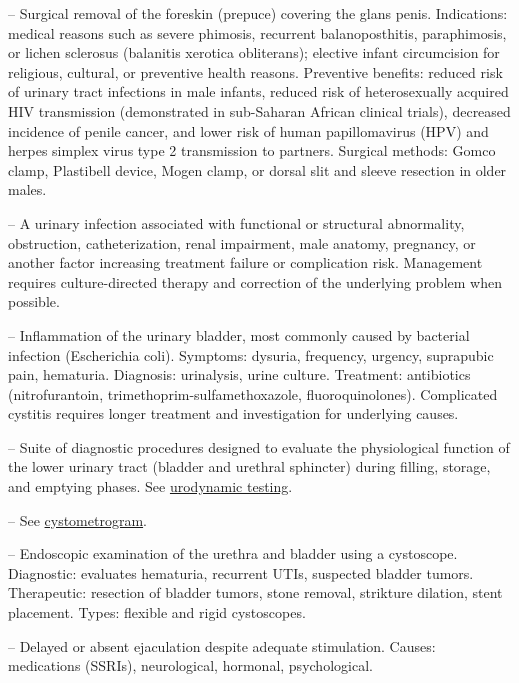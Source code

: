 -- Surgical removal of the foreskin (prepuce) covering the glans penis. Indications: medical reasons such as severe phimosis, recurrent balanoposthitis, paraphimosis, or lichen sclerosus (balanitis xerotica obliterans); elective infant circumcision for religious, cultural, or preventive health reasons. Preventive benefits: reduced risk of urinary tract infections in male infants, reduced risk of heterosexually acquired HIV transmission (demonstrated in sub-Saharan African clinical trials), decreased incidence of penile cancer, and lower risk of human papillomavirus (HPV) and herpes simplex virus type 2 transmission to partners. Surgical methods: Gomco clamp, Plastibell device, Mogen clamp, or dorsal slit and sleeve resection in older males.

-- A urinary infection associated with functional or structural abnormality, obstruction, catheterization, renal impairment, male anatomy, pregnancy, or another factor increasing treatment failure or complication risk. Management requires culture-directed therapy and correction of the underlying problem when possible.

-- Inflammation of the urinary bladder, most commonly caused by bacterial infection (Escherichia coli). Symptoms: dysuria, frequency, urgency, suprapubic pain, hematuria. Diagnosis: urinalysis, urine culture. Treatment: antibiotics (nitrofurantoin, trimethoprim-sulfamethoxazole, fluoroquinolones). Complicated cystitis requires longer treatment and investigation for underlying causes.

-- Suite of diagnostic procedures designed to evaluate the physiological function of the lower urinary tract (bladder and urethral sphincter) during filling, storage, and emptying phases. See \hyperlink{Urodynamic Testing}{urodynamic testing}.

-- See \hyperlink{Cystometrogram}{cystometrogram}.


-- Endoscopic examination of the urethra and bladder using a cystoscope. Diagnostic: evaluates hematuria, recurrent UTIs, suspected bladder tumors. Therapeutic: resection of bladder tumors, stone removal, strikture dilation, stent placement. Types: flexible and rigid cystoscopes.

-- Delayed or absent ejaculation despite adequate stimulation. Causes: medications (SSRIs), neurological, hormonal, psychological.

